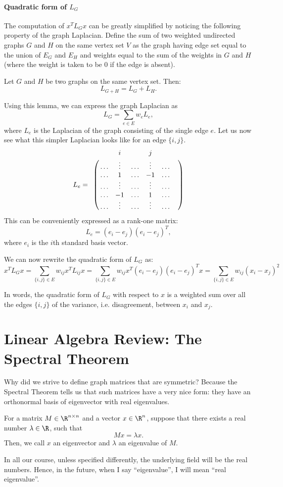 \paragraph{Quadratic form of $L_G$} 
The computation of $x^T L_G x$ can be greatly simplified by noticing the following property of the graph Laplacian. Define the sum of two weighted undirected graphs $G$ and $H$ on the same vertex set $V$ as the graph having edge set equal to the union of $E_G$ and $E_H$ and weights equal to the sum of the weights in $G$ and $H$ (where the weight is taken to be $0$ if the edge is absent).
\begin{lemma}
Let $G$ and $H$ be two graphs on the same vertex set. Then:
$$
L_{G+H} = L_G + L_H.
$$
\end{lemma}
Using this lemma, we can express the graph Laplacian as
$$
L_G = \sum_{e \in E} w_e L_e,
$$
where $L_e$ is the Laplacian of the graph consisting of the single edge $e$. Let us now see what this simpler Laplacian looks like for an edge $\{i,j\}.$
$$
L_e = \bordermatrix{    & & i & & j & &\cr
                        & \ldots & \vdots & \ldots  & \vdots & \ldots &\cr
                        & \ldots & 1 & \ldots &-1 & \ldots &\cr
                        & \ldots & \vdots &\ldots & \vdots &\ldots &\cr
                        & \ldots &-1 &\ldots & 1 & \ldots &\cr
                        & \ldots & \vdots &\ldots & \vdots &\ldots &\cr
}
$$
This can be conveniently expressed as a rank-one matrix:
$$
L_e = (e_i - e_j)(e_i - e_j)^T,
$$
where $e_i$ is the $i$th standard basis vector.

We can now rewrite the quadratic form of $L_G$ as:
$$
x^T L_G x = \sum_{\{i,j\} \in E}w_{ij} x^T L_{ij} x = \sum_{\{i,j\} \in E} w_{ij} x^T(e_i - e_j)(e_i - e_j)^Tx = \sum_{\{i,j\} \in E} w_{ij} (x_i - x_j)^2
$$

In words, the quadratic form of $L_G$ with respect to $x$ is a weighted sum over all the edges $\{i,j\}$ of the variance, i.e. disagreement, between $x_i$ and $x_j.$


\section{Linear Algebra Review: The Spectral Theorem}

Why did we strive to define graph matrices that are symmetric? Because the Spectral Theorem tells us that such matrices have a very nice form: they have an orthonormal basis of eigenvector with real eigenvalues.


\begin{definition} %
For a matrix $M \in \R^{n \times n}$ and a vector $x \in \R^n$, suppose that there exists a real number $\lambda \in \R$, such that
$$
Mx = \lambda x.
$$
Then, we call $x$ an \textrm{eigenvector} and $\lambda$ an \textrm{eigenvalue} of $M.$
\end{definition}
In all our course, unless specified differently, the underlying field will be the real numbers. Hence, in the future, when I say ``eigenvalue'', I will mean ``real eigenvalue''.


